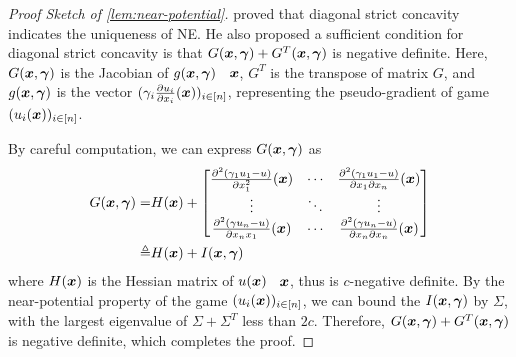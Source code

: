 \begin{proof}[Proof Sketch of \cref{lem:near-potential}]
\citet{concave_game-initial:rosen1965existence} proved that diagonal strict concavity indicates the uniqueness of NE. He also proposed a sufficient condition for diagonal strict concavity is that $G({\bm{x}},\bm{\gamma}) + G^T({\bm{x}}, \bm{\gamma})$ is negative definite. Here, $G({\bm{x}}, \bm{\gamma})$ is the Jacobian of $g({\bm{x}}, \bm{\gamma})$ \wrt\ ${\bm{x}}$, $G^T$ is the transpose of matrix $G$, and $g({\bm{x}}, \bm{\gamma})$ is the vector $(\gamma_i \frac{\partial u_i}{\partial x_i}({\bm{x}}))_{i\in[n]}$, representing the pseudo-gradient of game $(u_i({\bm{x}}))_{i\in[n]}$.

By careful computation, we can express $G({\bm{x}}, \bm{\gamma})$ as
\begin{align*}
    G({\bm{x}}, \bm{\gamma}) =& H({\bm{x}}) + \begin{bmatrix}
    \frac{\partial^2 (\gamma_1 u_1 - u)}{\partial x_1^2} ({\bm{x}}) & \cdots & \frac{\partial^2 (\gamma_1 u_1 - u)}{\partial x_1 \partial x_n}({\bm{x}})
    \\
    \vdots & \ddots & \vdots 
    \\
    \frac{\partial^2 (\gamma u_n - u)}{\partial x_n x_1} ({\bm{x}}) & \cdots & \frac{\partial^2 (\gamma u_n - u)}{\partial x_n \partial x_n}({\bm{x}})
    \end{bmatrix}
    \\
    \triangleq& H({\bm{x}}) + I({\bm{x}},\bm{\gamma}) 
\end{align*}
where $H({\bm{x}})$ is the Hessian matrix of $u({\bm{x}})$ \wrt\ ${\bm{x}}$, thus is $c$-negative definite. 
By the near-potential property of the game $(u_i({\bm{x}}))_{i\in[n]}$, we can bound the $I({\bm{x}}, \bm{\gamma})$ by $\Sigma$, with the largest eigenvalue of $\Sigma + \Sigma^T$ less than $2c$. Therefore, $G({\bm{x}}, \bm{\gamma}) +  G^T({\bm{x}}, \bm{\gamma})$ is negative definite, which completes the proof.
\end{proof}




